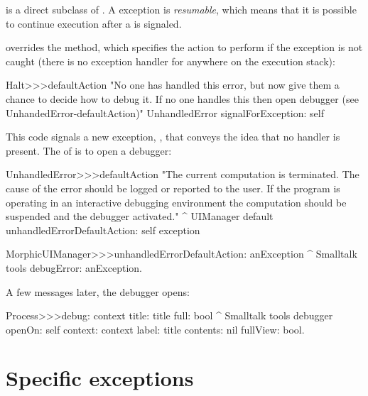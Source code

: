  is a direct subclass of . A  exception is \emph{resumable}, which means that it is possible to continue execution after a  is signaled. 

 overrides the  method, which specifies the action to perform if the exception is not caught (\ie there is no exception handler for  anywhere on the execution stack):

\begin{code}{}
Halt>>>defaultAction
	"No one has handled this error, but now give them a chance to decide
	how to debug it.  If no one handles this then open debugger
	(see UnhandedError-defaultAction)"
	UnhandledError signalForException: self
\end{code}

This code signals a new exception, , that conveys the idea that no handler is present. The  of  is to open a debugger:

\begin{code}{}
UnhandledError>>>defaultAction
	"The current computation is terminated. The cause of the error should be logged or reported to the user. If the program is operating in an interactive debugging environment the computation should be suspended and the debugger activated."
	^ UIManager default unhandledErrorDefaultAction: self exception
\end{code}

\begin{code}{}
MorphicUIManager>>>unhandledErrorDefaultAction: anException
	^ Smalltalk tools debugError: anException.
\end{code}


\noindent
A few messages later, the debugger opens:

\begin{code}{}
Process>>>debug: context title: title full: bool
	^ Smalltalk tools debugger
						openOn: self 
						context: context 
						label: title 
						contents: nil 
						fullView: bool.
\end{code}


\section{Specific exceptions}

